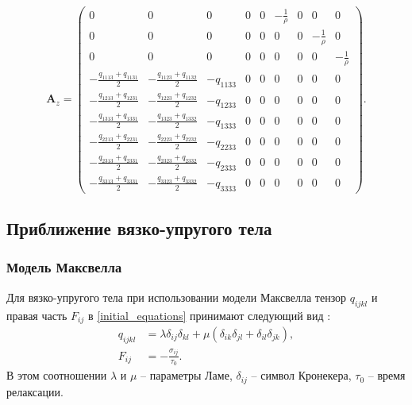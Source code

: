 \begin{displaymath}
\mathbf{A}_z =
\left( \begin{array}{cccccccccccc}
0 & 0 & 0 & 0 & 0 & -\frac 1 \rho & 0 & 0 & 0 \\ 
0 & 0 & 0 & 0 & 0 & 0 & 0 & -\frac 1 \rho & 0 \\ 
0 & 0 & 0 & 0 & 0 & 0 & 0 & 0 & -\frac 1 \rho \\ 
-\frac{q_{1113}+q_{1131}}{2} & -\frac{q_{1123}+q_{1132}}{2} & -q_{1133} & 0 & 0 & 0 & 0 & 0 & 0 \\ 
-\frac{q_{1213}+q_{1231}}{2} & -\frac{q_{1223}+q_{1232}}{2} & -q_{1233} & 0 & 0 & 0 & 0 & 0 & 0 \\ 
-\frac{q_{1313}+q_{1331}}{2} & -\frac{q_{1323}+q_{1332}}{2} & -q_{1333} & 0 & 0 & 0 & 0 & 0 & 0 \\ 
-\frac{q_{2213}+q_{2231}}{2} & -\frac{q_{2223}+q_{2232}}{2} & -q_{2233} & 0 & 0 & 0 & 0 & 0 & 0 \\ 
-\frac{q_{2313}+q_{2331}}{2} & -\frac{q_{2323}+q_{2332}}{2} & -q_{2333} & 0 & 0 & 0 & 0 & 0 & 0 \\ 
-\frac{q_{3313}+q_{3331}}{2} & -\frac{q_{3323}+q_{3332}}{2} & -q_{3333} & 0 & 0 & 0 & 0 & 0 & 0  
\end{array} \right).
\end{displaymath}


\clearpage
\newpage

\subsection{Приближение вязко-упругого тела}

\subsubsection{Модель Максвелла}
\label{viscosity_matrixes}

Для вязко-упругого тела при использовании модели Максвелла тензор $q_{ijkl}$ и правая часть $F_{ij}$ в \ref{initial_equations} принимают следующий вид \cite{godunov_phys}:
\begin{align}
\label{tensor_qijkl_viscosity}
q_{ijkl}&=\lambda\delta_{ij}\delta_{kl}+\mu(\delta_{ik}\delta_{jl}+\delta_{il}
\delta_{jk}),\nonumber\\
F_{ij}&=-\frac{\sigma_{ij}}{\tau_0}.
\end{align}
В этом соотношении $\lambda$ и $\mu$ -- параметры Ламе, $\delta_{ij}$ -- символ Кронекера, $\tau_0$ -- время релаксации.


